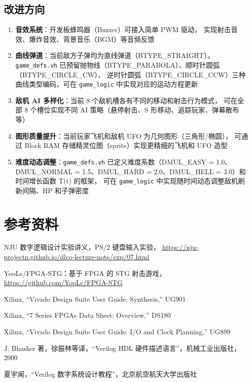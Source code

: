 \documentclass[12pt,a4paper]{ctexart}
\begin{document}
\subsection{改进方向}

\begin{enumerate}[label=(\arabic*)]
    \item \textbf{音效系统}：开发板蜂鸣器（Buzzer）可接入简单 PWM 驱动，
    实现射击音效、爆炸音效、背景音乐（BGM）等音频反馈
    \item \textbf{曲线弹道}：当前敌方子弹均为直线弹道（BTYPE\_STRAIGHT），
    \texttt{game\_defs.vh} 已预留抛物线（BTYPE\_PARABOLA）、顺时针圆弧（BTYPE\_CIRCLE\_CW）、
    逆时针圆弧（BTYPE\_CIRCLE\_CCW）三种曲线类型编码，可在 \texttt{game\_logic} 中实现对应的运动方程更新
    \item \textbf{敌机 AI 多样化}：当前 8 个敌机槽各有不同的移动和射击行为模式，
    可在全部 8 个槽位实现不同 AI 策略（悬停射击、S 形移动、追踪玩家、弹幕散布等）
    \item \textbf{图形质量提升}：当前玩家飞机和敌机 UFO 为几何图形（三角形/椭圆），
    可通过 Block RAM 存储精灵位图（sprite）实现更精细的飞机和 UFO 造型
    \item \textbf{难度动态调整}：\texttt{game\_defs.vh} 已定义难度系数（DMUL\_EASY = 1.0、
    DMUL\_NORMAL = 1.5、DMUL\_HARD = 2.0、DMUL\_HELL = 3.0）和时间增长函数 T(t) 的框架，
    可在 \texttt{game\_logic} 中实现随时间动态调整敌机刷新间隔、HP 和子弹密度
\end{enumerate}


\section{参考资料}

\begin{enumerate}[label={[\arabic*]}]
    \item NJU 数字逻辑设计实验讲义，PS/2 键盘输入实验，
          \url{https://nju-projectn.github.io/dlco-lecture-note/exp/07.html}
    \item YooLc/FPGA-STG：基于 FPGA 的 STG 射击游戏，
          \url{https://github.com/YooLc/FPGA-STG}
    \item Xilinx, ``Vivado Design Suite User Guide: Synthesis,'' UG901
    \item Xilinx, ``7 Series FPGAs Data Sheet: Overview,'' DS180
    \item Xilinx, ``Vivado Design Suite User Guide: I/O and Clock Planning,'' UG899
    \item J. Bhasker 著，徐振林等译，``Verilog HDL 硬件描述语言''，机械工业出版社，2000
    \item 夏宇闻，``Verilog 数字系统设计教程''，北京航空航天大学出版社
\end{enumerate}
\end{document}

